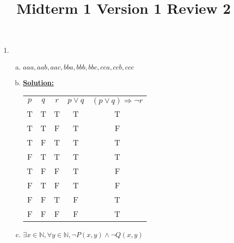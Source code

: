 \documentclass[12pt]{article}
\begin{document}
\title{Midterm 1 Version 1 Review 2}
\maketitle

\begin{enumerate}[1.]
    \item

    \begin{enumerate}[a)]
        \item ${aaa,aab,aac,bba,bbb,bbc,cca,ccb,ccc}$
        \item

        \underline{\textbf{Solution:}}

        \begin{tabular}{|c|c|c|c|c|}
            \hline
            $p$ & $q$ & $r$ & $p \lor q$ & $(p \lor q) \Rightarrow \neg r$\\
            T & T & T & T & T \\
            \hline
            T & T & F & T & F \\
            \hline
            T & F & T & T & T \\
            \hline
            F & T & T & T & T \\
            \hline
            T & F & F & T & F \\
            \hline
            F & T & F & T & F \\
            \hline
            F & F & T & F & T \\
            \hline
            F & F & F & F & T \\
            \hline
        \end{tabular}

        \item

        $\exists x \in \mathbb{N}, \forall y \in \mathbb{N}, \neg P(x,y) \land \neg Q(x,y)$
    \end{enumerate}
\end{enumerate}
\end{document}
